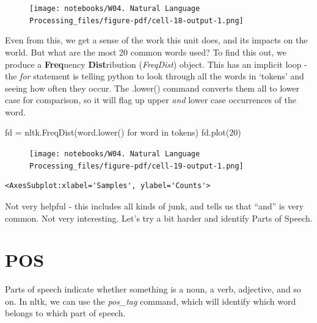 \documentclass[
  letterpaper,
  DIV=11,
  numbers=noendperiod]{scrreprt}
\newenvironment{Shaded}{\begin{snugshade}}{\end{snugshade}}
\newcommand{\ControlFlowTok}[1]{\textcolor[rgb]{0.00,0.23,0.31}{#1}}
\newcommand{\DecValTok}[1]{\textcolor[rgb]{0.68,0.00,0.00}{#1}}
\newcommand{\KeywordTok}[1]{\textcolor[rgb]{0.00,0.23,0.31}{#1}}
\newcommand{\NormalTok}[1]{\textcolor[rgb]{0.00,0.23,0.31}{#1}}
\newcommand{\OperatorTok}[1]{\textcolor[rgb]{0.37,0.37,0.37}{#1}}
\begin{document}
\begin{figure}[H]

{\centering \texttt{[image: notebooks/W04. Natural Language Processing\_files/figure-pdf/cell-18-output-1.png]}

}

\end{figure}

Even from this, we get a sense of the work this unit does, and its
impacts on the world. But what are the most 20 common words used? To
find this out, we produce a \textbf{Freq}uency \textbf{Dist}ribution
(\emph{FreqDist}) object. This has an implicit loop - the \emph{for}
statement is telling python to look through all the words in `tokens'
and seeing how often they occur. The .lower() command converts them all
to lower case for comparison, so it will flag up upper \emph{and} lower
case occurrences of the word.

\begin{Shaded}
\begin{Highlighting}[]
\NormalTok{fd }\OperatorTok{=}\NormalTok{ nltk.FreqDist(word.lower() }\ControlFlowTok{for}\NormalTok{ word }\KeywordTok{in}\NormalTok{ tokens)}
\NormalTok{fd.plot(}\DecValTok{20}\NormalTok{)}
\end{Highlighting}
\end{Shaded}

\begin{figure}[H]

{\centering \texttt{[image: notebooks/W04. Natural Language Processing\_files/figure-pdf/cell-19-output-1.png]}

}

\end{figure}

\begin{verbatim}
<AxesSubplot:xlabel='Samples', ylabel='Counts'>
\end{verbatim}

Not very helpful - this includes all kinds of junk, and tells us that
``and'' is very common. Not very interesting. Let's try a bit harder and
identify Parts of Speech.

\hypertarget{pos}{%
\section{POS}\label{pos}}

Parts of speech indicate whether something is a noun, a verb, adjective,
and so on. In nltk, we can use the \emph{pos\_tag} command, which will
identify which word belongs to which part of speech.
\end{document}
